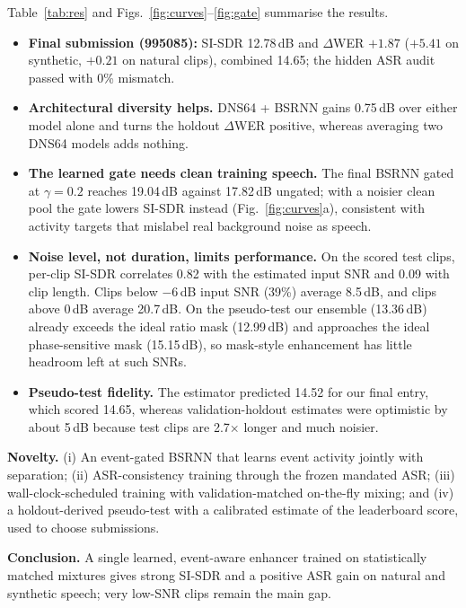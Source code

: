 \documentclass[conference]{IEEEtran}
\begin{document}
Table~\ref{tab:res} and Figs.~\ref{fig:curves}--\ref{fig:gate} summarise the results.
\begin{itemize}
\item \textbf{Final submission (995085):} SI-SDR 12.78\,dB and $\Delta$WER $+1.87$ ($+5.41$ on synthetic, $+0.21$
on natural clips), combined 14.65; the hidden ASR audit passed with 0\% mismatch.
\item \textbf{Architectural diversity helps.} DNS64 + BSRNN gains 0.75\,dB over either model alone and turns the
holdout $\Delta$WER positive, whereas averaging two DNS64 models adds nothing.
\item \textbf{The learned gate needs clean training speech.} The final BSRNN gated at $\gamma=0.2$ reaches
19.04\,dB against 17.82\,dB ungated; with a noisier clean pool the gate lowers SI-SDR instead
(Fig.~\ref{fig:curves}a), consistent with activity targets that mislabel real background noise as speech.
\item \textbf{Noise level, not duration, limits performance.} On the scored test clips, per-clip SI-SDR correlates
0.82 with the estimated input SNR and 0.09 with clip length. Clips below $-6$\,dB input SNR (39\%) average
8.5\,dB, and clips above 0\,dB average 20.7\,dB. On the pseudo-test our ensemble (13.36\,dB) already exceeds the
ideal ratio mask (12.99\,dB) and approaches the ideal phase-sensitive mask (15.15\,dB), so mask-style enhancement
has little headroom left at such SNRs.
\item \textbf{Pseudo-test fidelity.} The estimator predicted 14.52 for our final entry, which scored 14.65, whereas
validation-holdout estimates were optimistic by about 5\,dB because test clips are 2.7$\times$ longer and much
noisier.
\end{itemize}

\textbf{Novelty.} (i) An event-gated BSRNN that learns event activity jointly with separation; (ii)
ASR-consistency training through the frozen mandated ASR; (iii) wall-clock-scheduled training with
validation-matched on-the-fly mixing; and (iv) a holdout-derived pseudo-test with a calibrated estimate of the
leaderboard score, used to choose submissions.

\textbf{Conclusion.} A single learned, event-aware enhancer trained on statistically matched mixtures gives strong
SI-SDR and a positive ASR gain on natural and synthetic speech; very low-SNR clips remain the main gap.
\end{document}
